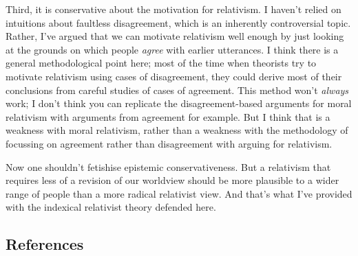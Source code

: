 \documentclass[
  11pt,
  letterpaper,
  DIV=11,
  numbers=noendperiod,
  oneside]{scrartcl}
\begin{document}
Third, it is conservative about the motivation for relativism. I haven't
relied on intuitions about faultless disagreement, which is an
inherently controversial topic. Rather, I've argued that we can motivate
relativism well enough by just looking at the grounds on which people
\emph{agree} with earlier utterances. I think there is a general
methodological point here; most of the time when theorists try to
motivate relativism using cases of disagreement, they could derive most
of their conclusions from careful studies of cases of agreement. This
method won't \emph{always} work; I don't think you can replicate the
disagreement-based arguments for moral relativism with arguments from
agreement for example. But I think that is a weakness with moral
relativism, rather than a weakness with the methodology of focussing on
agreement rather than disagreement with arguing for relativism.

Now one shouldn't fetishise epistemic conservativeness. But a relativism
that requires less of a revision of our worldview should be more
plausible to a wider range of people than a more radical relativist
view. And that's what I've provided with the indexical relativist theory
defended here.

\subsection*{References}\label{references}
\end{document}
